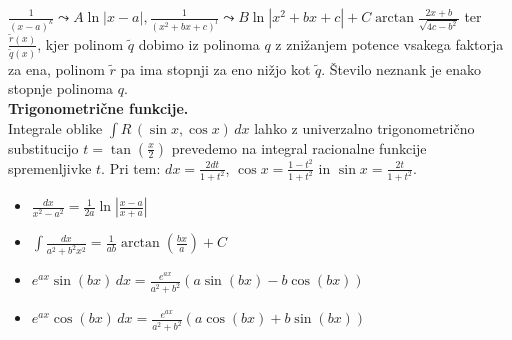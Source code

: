 \documentclass[a4paper,oneside,8pt,landscape]{extarticle}
\begin{document}
\begin{multicols*}{3}
\(\frac{1}{(x-a)^k} \leadsto A \ln |x-a|, \frac{1}{(x^2+bx+c)^l} \leadsto B \ln |x^2+bx+c| + C \arctan \frac{2x+b}{\sqrt{4c-b^2}}\) ter \(\frac{\widetilde{r}(x)}{\widetilde{q}(x)}\), kjer polinom $\widetilde{q}$ dobimo iz polinoma $q$ z znižanjem potence vsakega faktorja za ena, polinom $\widetilde{r}$ pa ima stopnji za eno nižjo kot $\widetilde{q}$. Število neznank je enako stopnje polinoma $q$.\\
\textbf{Trigonometrične funkcije.}\\
Integrale oblike $\int R \, (\sin x, \cos x) \, dx$ lahko z univerzalno trigonometrično substitucijo $t = \tan \left(\frac{x}{2}\right)$ prevedemo na integral racionalne funkcije spremenljivke $t$. Pri tem: \(dx = \frac{2dt}{1+t^2}\), \(\cos x = \frac{1-t^2}{1+t^2}\) in \(\sin x = \frac{2t}{1+t^2}\).
\begin{itemize}
    \item \(\frac{dx}{x^2-a^2} = \frac{1}{2a} \ln \left| \frac{x-a}{x+a} \right|\)
    \item \(\int \frac{dx}{a^2+b^2 x^2} = \frac{1}{ab} \arctan \left(\frac{bx}{a}\right) + C\)
    \item \(e^{ax} \sin (bx) \, dx = \frac{e^{ax}}{a^2+b^2}(a  \sin (bx) - b \cos (bx))\)
    \item \(e^{ax} \cos (bx) \, dx = \frac{e^{ax}}{a^2+b^2}(a  \cos (bx) + b \sin (bx))\)
\end{itemize}


\end{multicols*}
\end{document}
